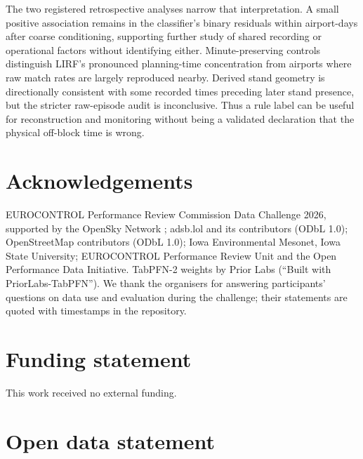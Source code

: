 \documentclass[
  manuscript=article,  %
  layout=preprint,     %
  year=2026,
  volume=4,
]{extra/joas}
\begin{document}
The two registered retrospective analyses narrow that interpretation. A small positive association remains in the classifier's binary residuals within airport-days after coarse conditioning, supporting further study of shared recording or operational factors without identifying either. Minute-preserving controls distinguish LIRF's pronounced planning-time concentration from airports where raw match rates are largely reproduced nearby. Derived stand geometry is directionally consistent with some recorded times preceding later stand presence, but the stricter raw-episode audit is inconclusive. Thus a rule label can be useful for reconstruction and monitoring without being a validated declaration that the physical off-block time is wrong.

\section*{Acknowledgements}\label{acknowledgements}

EUROCONTROL Performance Review Commission Data Challenge 2026, supported by the OpenSky Network \autocite{schafer2014opensky}; adsb.lol and its contributors (ODbL 1.0); \textcopyright{} OpenStreetMap contributors (ODbL 1.0); Iowa Environmental Mesonet, Iowa State University; EUROCONTROL Performance Review Unit and the Open Performance Data Initiative. TabPFN-2 weights by Prior Labs (``Built with PriorLabs-TabPFN''). We thank the organisers for answering participants' questions on data use and evaluation during the challenge; their statements are quoted with timestamps in the repository.

\section*{Funding statement}\label{funding-statement}

This work received no external funding.

\section*{Open data statement}\label{open-data-statement}
\end{document}
